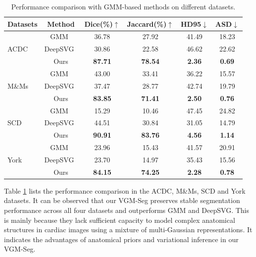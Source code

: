 \documentclass[preprint,12pt]{elsarticle}
\begin{document}
\begin{table}[htbp]
  \centering
  \caption{Performance comparison with GMM-based methods on different datasets.}
  \begin{tabular}{l c c c c c}
    \toprule
    Datasets & Method &  Dice(\%)$\uparrow$ & Jaccard(\%)$\uparrow$ & HD95$\downarrow$ & ASD$\downarrow$ \\
    \midrule
    \multirow{3}{*}{ACDC} & GMM~\cite{zhang2002segmentation} &  36.78 & 27.92 &  41.49 & 18.23 \\
    & DeepSVG~\cite{deepGMM} &  30.86 & 22.58 & 46.62 & 22.62 \\
    & Ours & \textbf{87.71} & \textbf{78.54} & \textbf{2.36} & \textbf{0.69} \\
    \midrule
    \multirow{3}{*}{M\&Ms} & GMM~\cite{zhang2002segmentation} & 43.00 & 33.41 & 36.22 & 15.57 \\
    & DeepSVG~\cite{deepGMM} & 37.47 & 28.77 & 42.74 & 19.79 \\
    & Ours &  \textbf{83.85} & \textbf{71.41} & \textbf{2.50} & \textbf{0.76} \\
    \midrule
    \multirow{3}{*}{SCD} & GMM~\cite{zhang2002segmentation} &  15.29 & 10.46 & 47.45 & 24.82 \\
    & DeepSVG~\cite{deepGMM} &  44.51 & 30.84 & 31.05 & 14.79 \\
    & Ours & \textbf{90.91} & \textbf{83.76} & \textbf{4.56} & \textbf{1.14} \\
    \midrule
    \multirow{3}{*}{York} & GMM~\cite{zhang2002segmentation} &  23.96 & 15.43 & 41.57 & 20.91 \\
    & DeepSVG~\cite{deepGMM} &  23.70 & 14.97 & 35.43 & 15.56 \\
    & Ours & \textbf{84.15} & \textbf{74.25} & \textbf{2.28} & \textbf{0.78} \\
    \bottomrule
  \end{tabular}%
  \label{tab:GMM}
\end{table}


Table \ref{tab:GMM} lists the performance comparison in the ACDC, M\&Ms, SCD and York datasets. It can be observed that our VGM-Seg preserves stable segmentation performance across all four datasets and outperforms GMM and DeepSVG. This is mainly because they lack sufficient capacity to model complex anatomical structures in cardiac images using a mixture of multi-Gaussian representations. It indicates the advantages of anatomical priors and variational inference in our VGM-Seg. 
\end{document}
